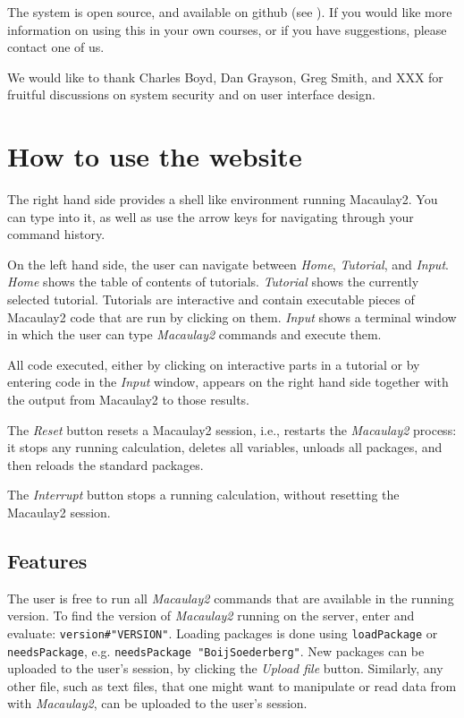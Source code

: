 \documentclass[]{article}
\def\M2{{\it Macaulay2}}
\begin{document}
The system is open source, and available on github (see \cite{github}).
If you would like more information on using this in your own courses,
or if you have suggestions, please contact one of us.

We would like to thank Charles Boyd, Dan Grayson, Greg Smith, and XXX for
fruitful discussions on system security and on user interface design.

\section{How to use the website}
The right hand side provides a shell like environment running
Macaulay2. You can type into it, as well as use the arrow keys for
navigating through your command history.

On the left hand side, the user can navigate between {\it Home}, {\it
  Tutorial}, and {\it Input}. {\it Home} shows the table of contents
of tutorials. {\it Tutorial} shows the currently selected
tutorial. Tutorials are interactive and contain executable pieces of
Macaulay2 code that are run by clicking on them. {\it Input} shows a
terminal window in which the user can type {\it Macaulay2} commands and execute them.

All code executed, either by clicking on interactive parts in a
tutorial or by entering code in the {\it Input} window, appears on the
right hand side together with the output from Macaulay2 to those
results.

The {\it Reset} button resets a Macaulay2 session, i.e., restarts 
the \M2 process: it stops any running calculation, deletes all variables, 
unloads all packages, and then reloads the standard packages.

The {\it Interrupt} button stops a running calculation, without
resetting the Macaulay2 session.

\subsection{Features}

The user is free to run all \M2 commands that are available in the
running version. To find the version of \M2 running on the server,
enter and evaluate: {\tt version\#"VERSION"}.  Loading packages is
done using {\tt loadPackage} or {\tt needsPackage}, e.g. {\tt needsPackage "BoijSoederberg"}.  
New packages can be
uploaded to the user's session, by clicking the {\it Upload file}
button. Similarly, any other file, such as text files, that one might
want to manipulate or read data from with \M2, can be uploaded to
the user's session.
\end{document}
